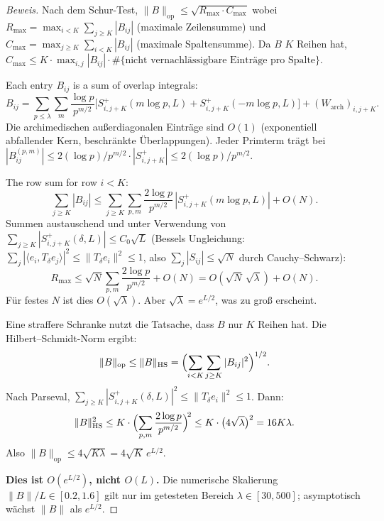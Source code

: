 ﻿\documentclass[12pt,a4paper]{article}
\theoremstyle{definition}
\theoremstyle{remark}
\begin{document}
\begin{proof}[Beweis]
Nach dem Schur-Test, $\|B\|_{\mathrm{op}} \leq \sqrt{R_{\max}\cdot C_{\max}}$ wobei $R_{\max} = \max_{i < K}\sum_{j \geq K}|B_{ij}|$ (maximale Zeilensumme) und $C_{\max} = \max_{j \geq K}\sum_{i < K}|B_{ij}|$ (maximale Spaltensumme). Da $B$ $K$ Reihen hat, $C_{\max} \leq K \cdot \max_{i,j}|B_{ij}| \cdot \#\{\text{nicht vernachlässigbare Einträge pro Spalte}\}$.

Each entry $B_{ij}$ is a sum of overlap integrals:
\[
  B_{ij} = \sum_{p \leq \lambda}\sum_m \frac{\log p}{p^{m/2}}\bigl[S_{i,j+K}^+(m\log p, L) + S_{i,j+K}^+(-m\log p, L)\bigr] + (W_{\mathrm{arch}})_{i,j+K}.
\]
Die archimedischen außerdiagonalen Einträge sind $O(1)$ (exponentiell abfallender Kern, beschränkte Überlappungen). Jeder Primterm trägt bei
$|B_{ij}^{(p,m)}| \leq 2(\log p)/p^{m/2} \cdot |S_{i,j+K}^+| \leq 2(\log p)/p^{m/2}$.

The row sum for row $i < K$:
\[
  \sum_{j \geq K}|B_{ij}|
  \leq \sum_{j \geq K}\sum_{p,m}\frac{2\log p}{p^{m/2}}\,|S_{i,j+K}^+(m\log p, L)| + O(N).
\]
Summen austauschend und unter Verwendung von $\sum_{j \geq K} |S_{i,j+K}^+(\delta, L)| \leq C_0\sqrt{L}$ (Bessels Ungleichung: $\sum_j |\langle e_i, T_\delta e_j\rangle|^2 \leq \|T_\delta e_i\|^2 \leq 1$, also $\sum_j |S_{ij}| \leq \sqrt{N}$ durch Cauchy--Schwarz):
\[
  R_{\max} \leq \sqrt{N}\sum_{p,m}\frac{2\log p}{p^{m/2}} + O(N) = O(\sqrt{N}\,\sqrt{\lambda}) + O(N).
\]
Für festes $N$ ist dies $O(\sqrt{\lambda})$. Aber $\sqrt{\lambda} = e^{L/2}$, was zu groß erscheint.

Eine straffere Schranke nutzt die Tatsache, dass $B$ nur $K$ Reihen hat. Die Hilbert--Schmidt-Norm ergibt:
\[
  \|B\|_{\mathrm{op}} \leq \|B\|_{\mathrm{HS}} = \Bigl(\sum_{i < K}\sum_{j \geq K}|B_{ij}|^2\Bigr)^{1/2}.
\]
Nach Parseval, $\sum_{j \geq K} |S_{i,j+K}^+(\delta,L)|^2 \leq \|T_\delta e_i\|^2 \leq 1$. Dann:
\[
  \|B\|_{\mathrm{HS}}^2
  \leq K\cdot\Bigl(\sum_{p,m}\frac{2\log p}{p^{m/2}}\Bigr)^{\!2}
  \leq K\cdot\bigl(4\sqrt{\lambda}\bigr)^2 = 16K\lambda.
\]
Also $\|B\|_{\mathrm{op}} \leq 4\sqrt{K\lambda} = 4\sqrt{K}\,e^{L/2}$.

\textbf{Dies ist $O(e^{L/2})$, nicht $O(L)$.} Die numerische Skalierung $\|B\|/L \in [0.2, 1.6]$ gilt nur im getesteten Bereich $\lambda \in [30, 500]$; asymptotisch wächst $\|B\|$ als $e^{L/2}$.
\end{proof}
\end{document}
